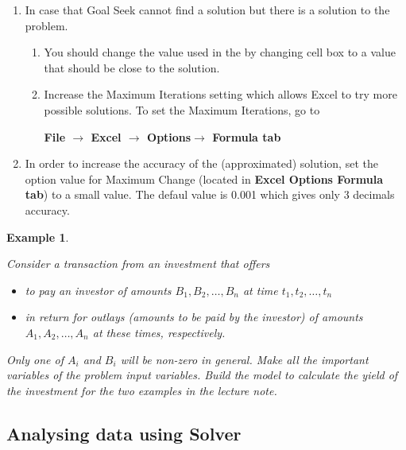 \documentclass[
]{article}
\theoremstyle{definition}
\theoremstyle{definition}
\newtheorem{example}{Example}[section]
\theoremstyle{definition}
\theoremstyle{definition}
\theoremstyle{remark}
\begin{document}
\begin{enumerate}
\def\labelenumi{\arabic{enumi}.}
\item
  In case that Goal Seek cannot find a solution but there is a
  solution to the problem.

  \begin{enumerate}
  \def\labelenumii{\arabic{enumii}.}
  \item
    You should change the value used in the by changing cell box to
    a value that should be close to the solution.
  \item
    Increase the Maximum Iterations setting which allows Excel to
    try more possible solutions. To set the Maximum Iterations, go
    to

    \textbf{File \(\rightarrow\) Excel \(\rightarrow\) Options\(\rightarrow\) Formula tab}
  \end{enumerate}
\item
  In order to increase the accuracy of the (approximated) solution,
  set the option value for Maximum Change (located in \textbf{Excel Options
  Formula tab}) to a small value. The defaul value is 0.001 which
  gives only 3 decimals accuracy.
\end{enumerate}

\begin{example}
\protect\hypertarget{exm:exampleYield}{}\label{exm:exampleYield}

\emph{Consider a transaction from an investment that offers}

\begin{itemize}
\item
  \emph{to pay an investor of amounts \(B_1, B_2, \ldots, B_n\) at time
  \(t_1, t_2, \ldots ,t_n\)}
\item
  \emph{in return for outlays (amounts to be paid by the investor) of
  amounts \(A_1, A_2, \ldots, A_n\) at these times, respectively.}
\end{itemize}

\emph{Only one of \(A_i\) and \(B_i\) will be non-zero in general. Make all the
important variables of the problem input variables. Build the model to
calculate the yield of the investment for the two examples in the
lecture note.}

\end{example}

\hypertarget{analysing-data-using-solver}{%
\subsection{Analysing data using Solver}\label{analysing-data-using-solver}}
\end{document}
